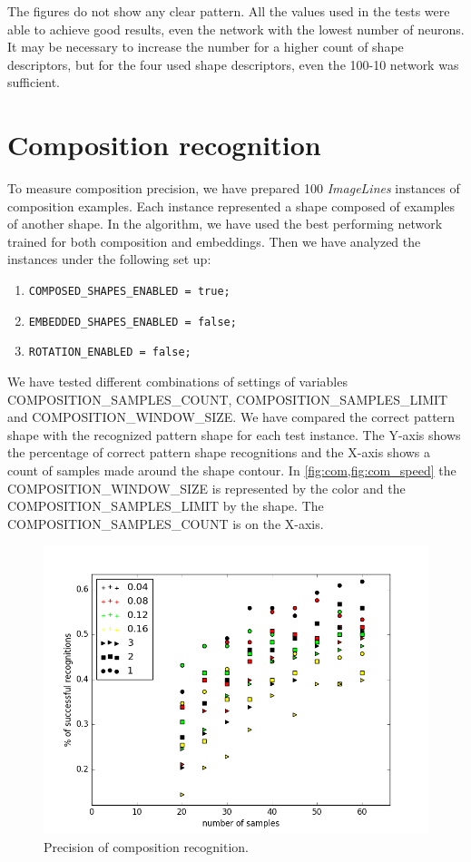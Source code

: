 The figures do not show any clear pattern. All the values used in the tests were able to achieve good results, even the network with the lowest number of neurons. It may be necessary to increase the number for a higher count of shape descriptors, but for the four used shape descriptors, even the 100-10 network was sufficient.

\section{Composition recognition}
To measure composition precision, we have prepared 100 \emph{ImageLines} instances of composition examples. Each instance represented a shape composed of examples of another shape. In the algorithm, we have used the best performing network trained for both composition and embeddings. Then we have analyzed the instances under the following set up:
\begin{enumerate}
\item \texttt{COMPOSED\_SHAPES\_ENABLED = true;}
\item \texttt{EMBEDDED\_SHAPES\_ENABLED = false;}
\item \texttt{ROTATION\_ENABLED = false;}
\end{enumerate}


We have tested different combinations of settings of variables COMPOSITION\_SAMPLES\_COUNT, COMPOSITION\_SAMPLES\_LIMIT and COMPOSITION\_WINDOW\_SIZE. We have compared the correct pattern shape with the recognized pattern shape for each test instance. The Y-axis shows the percentage of correct pattern shape recognitions and the X-axis shows a count of samples made around the shape contour. In \cref{fig:com,fig:com_speed} the COMPOSITION\_WINDOW\_SIZE is represented by the color and the COMPOSITION\_SAMPLES\_LIMIT by the shape. The COMPOSITION\_SAMPLES\_COUNT is on the X-axis. 
\begin{figure}
\centering
\includegraphics[width=.8\linewidth]{ext/figure_composition.png}
\caption{Precision of composition recognition. }
\label{fig:com}
\end{figure}

